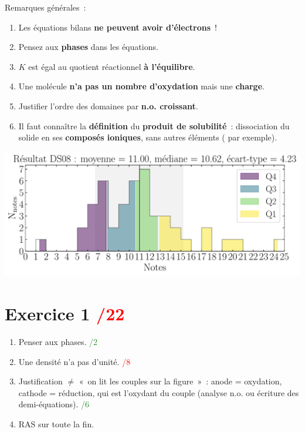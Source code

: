 \documentclass[a4paper, 12pt, final, garamond]{book}
\begin{document}
Remarques générales~:
\begin{enumerate}
  \item Les équations bilans \textbf{ne peuvent avoir d'électrons}~!
  \item Pensez aux \textbf{phases} dans les équations.
  \item $K$ est égal au quotient réactionnel \textbf{à l'équilibre}.
  \item Une molécule \textbf{n'a pas un nombre d'oxydation} mais une
    \textbf{charge}.
  \item Justifier l'ordre des domaines par \textbf{n.o. croissant}.
  \item Il faut connaître la \textbf{définition} du \textbf{produit de
    solubilité}~: dissociation du solide en ses \textbf{composés ioniques}, sans
    autres éléments ( par exemple).
\end{enumerate}

\begin{center}
    \includegraphics[width=.8\linewidth]{res_DS08.pdf}
\end{center}
\vspace*{-20pt}

\section{Exercice 1 \hfill \textcolor{red}{/22}}
\begin{enumerate}
  \item Penser aux phases.
    \hfill \textcolor{ForestGreen}{/2}
  \item Une densité n'a pas d'unité.
    \hfill \textcolor{red}{/8}
  \item Justification $\neq$ «~on lit les couples sur la figure~»~: anode =
    oxydation, cathode = réduction, qui est l'oxydant du couple (analyse n.o. ou
    écriture des demi-équations).
    \hfill \textcolor{ForestGreen}{/6}
  \item RAS sur toute la fin.
\end{enumerate}
\end{document}
